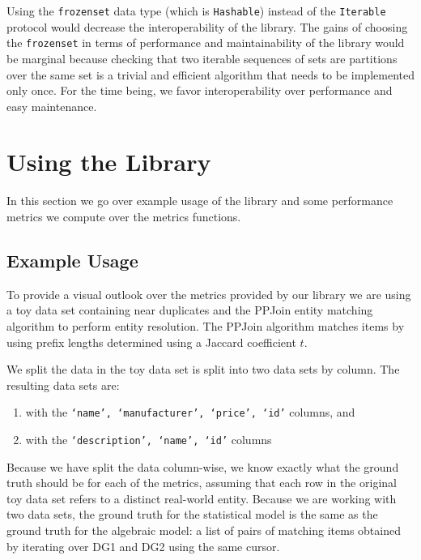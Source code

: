 \documentclass[11pt]{article}
\begin{document}
    Using the \texttt{frozenset} data type (which is \texttt{Hashable}) instead
    of the \texttt{Iterable} protocol would decrease the interoperability of the
    library.
    The gains of choosing the \texttt{frozenset} in terms of performance and
    maintainability of the library would be marginal because checking that two
    iterable sequences of sets are partitions over the same set is a trivial and
    efficient algorithm that needs to be implemented only once.
    For the time being, we favor interoperability over performance and easy
    maintenance.

    \section{Using the Library}\label{sec:usage}

    In this section we go over example usage of the library and some performance
    metrics we compute over the metrics functions.

    \subsection{Example Usage}

    To provide a visual outlook over the metrics provided by our library we are
    using a toy data set\cite{expdata2023} containing near duplicates and the
    PPJoin\cite{ppjoin} entity matching algorithm to perform entity resolution.
    The PPJoin algorithm matches items by using prefix lengths determined using
    a Jaccard coefficient $t$.
    
    We split the data in the toy data set is split into two data sets by column.
    The resulting data sets are:
    
    \begin{enumerate}[label={\bfseries DG\arabic*:},leftmargin=2cm]
        \item with the \texttt{`name', `manufacturer', `price', `id'} columns,
        and
        \item with the \texttt{`description', `name', `id'} columns\@
    \end{enumerate}

    Because we have split the data column-wise, we know exactly what the ground
    truth should be for each of the metrics, assuming that each row in the
    original toy data set refers to a distinct real-world entity.
    Because we are working with two data sets, the ground truth for the
    statistical model is the same as the ground truth for the algebraic model:
    a list of pairs of matching items obtained by iterating over DG1 and DG2
    using the same cursor.
\end{document}
